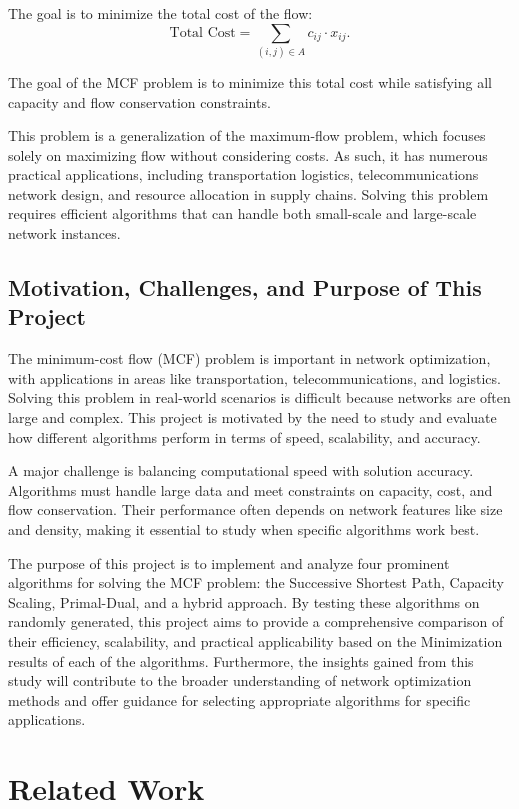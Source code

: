 \documentclass{article}
\begin{document}
The goal is to minimize the total cost of the flow:
\[
\text{Total Cost} = \sum_{(i,j) \in A} c_{ij} \cdot x_{ij}.
\]


The goal of the MCF problem is to minimize this total cost while satisfying all capacity and flow conservation constraints.~\cite{kovacs2015minimum}

This problem is a generalization of the maximum-flow problem, which focuses solely on maximizing flow without considering costs. As such, it has numerous practical applications, including transportation logistics, telecommunications network design, and resource allocation in supply chains. Solving this problem requires efficient algorithms that can handle both small-scale and large-scale network instances.

\subsection{Motivation, Challenges, and Purpose of This Project}
The minimum-cost flow (MCF) problem is important in network optimization, with applications in areas like transportation, telecommunications, and logistics. Solving this problem in real-world scenarios is difficult because networks are often large and complex. This project is motivated by the need to study and evaluate how different algorithms perform in terms of speed, scalability, and accuracy.

A major challenge is balancing computational speed with solution accuracy. Algorithms must handle large data and meet constraints on capacity, cost, and flow conservation. Their performance often depends on network features like size and density, making it essential to study when specific algorithms work best.

The purpose of this project is to implement and analyze four prominent algorithms for solving the MCF problem: the Successive Shortest Path, Capacity Scaling, Primal-Dual, and a hybrid approach. By testing these algorithms on randomly generated, this project aims to provide a comprehensive comparison of their efficiency, scalability, and practical applicability based on the Minimization results of each of the algorithms. Furthermore, the insights gained from this study will contribute to the broader understanding of network optimization methods and offer guidance for selecting appropriate algorithms for specific applications.

\section{Related Work}
\end{document}
